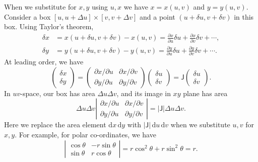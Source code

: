 \documentclass[letter-paper]{tufte-book}
\newcommand{\dy}{\partial}
\newcommand{\ddy}[2]{\frac{\dy#1}{\dy#2}}
\begin{document}
When we substitute for $x,y$ using $u,x$ we have $x=x(u,v)$ and $y=y(u,v)$.
Consider a box $[u, u + \Delta u]\times[v, v + \Delta v]$ and a point $(u +
\delta u, v + \delta v)$ in this box. Using Taylor's theorem,
\begin{align*}
  \delta x &= x(u+\delta u, v+\delta v) - x(u,v) = \ddy{x}{u}\delta u + \ddy{x}{v}\delta v + \cdots, \\
  \delta y &= y(u+\delta u, v+\delta v) - y(u,v) = \ddy{y}{u}\delta u + \ddy{y}{v}\delta v + \cdots.
\end{align*}
At leading order, we have
\begin{equation*}
  \begin{pmatrix}\delta x\\ \delta y\end{pmatrix} = 
  \begin{pmatrix}
    \dy x/\dy u & \dy x/\dy v\\ \dy y/\dy u & \dy y/\dy v
  \end{pmatrix}
  \begin{pmatrix}\delta u\\ \delta v\end{pmatrix}
  = \boldsymbol{\mathsf{J}}\begin{pmatrix}\delta u\\ \delta v\end{pmatrix}.
\end{equation*}
In $uv$-space, our box has area $\Delta u\Delta v$, and its image in $xy$ plane
has area
\begin{equation*}
  \Delta u\Delta v
  \left|\begin{matrix}
    \dy x/\dy u & \dy x/\dy v\\ \dy y/\dy u & \dy y/\dy v
  \end{matrix}\right| = |\boldsymbol{\mathsf{J}}|\Delta u\Delta v.
\end{equation*}
Here we replace the area element $\mathrm{d}x\, \mathrm{d}y$ with
$|\boldsymbol{\mathsf{J}}|\, \mathrm{d}u\, \mathrm{d}v$ when we substitute $u,v$
for $x,y$. For example, for polar co-ordinates, we have
\begin{equation*}
  \left|\begin{matrix}
    \cos\theta & -r\sin\theta\\ \sin\theta & r\cos\theta
  \end{matrix}\right| = r\cos^2\theta + r\sin^2\theta = r.
\end{equation*}
\end{document}
